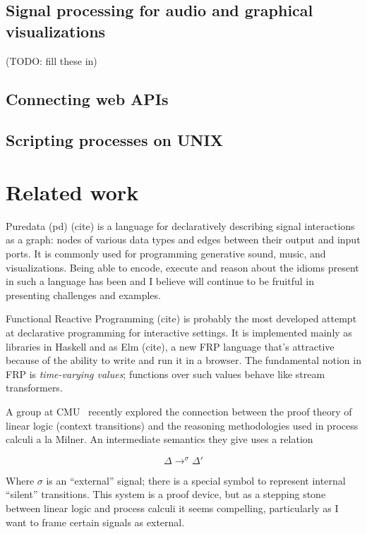\documentclass{article}
\begin{document}
\subsection{Signal processing for audio and graphical visualizations}
(TODO: fill these in)

\subsection{Connecting web APIs}

\subsection{Scripting processes on UNIX}

\section{Related work}

Puredata (pd) (cite) is a language for declaratively describing signal
interactions as a graph: nodes of various data types and edges between
their output and input ports. It is commonly used for programming
generative sound, music, and visualizations. Being able to encode, execute
and reason about the idioms present in such a language has been and I
believe will continue to be fruitful in presenting challenges and examples.

Functional Reactive Programming (cite) is probably the most developed attempt at 
declarative programming for interactive settings. It is implemented mainly
as libraries in Haskell and as Elm (cite), a new FRP language that's
attractive because of the ability to write and run it in a browser. The
fundamental notion in FRP is {\em time-varying values}; functions over such
values behave like stream transformers.

A group at CMU~\cite{RelatingReasoning} recently explored the connection between the proof
theory of linear logic (context transitions) and the reasoning
methodologies used in process calculi a la Milner. An intermediate
semantics they give uses a relation

\[
\Delta \longrightarrow^{\sigma} \Delta'
\]

Where $\sigma$ is an ``external'' signal; there is a special symbol to
represent internal ``silent'' transitions. This system is a proof device,
but as a stepping stone between linear logic and process calculi it seems
compelling, particularly as I want to frame certain signals as external.
\end{document}
